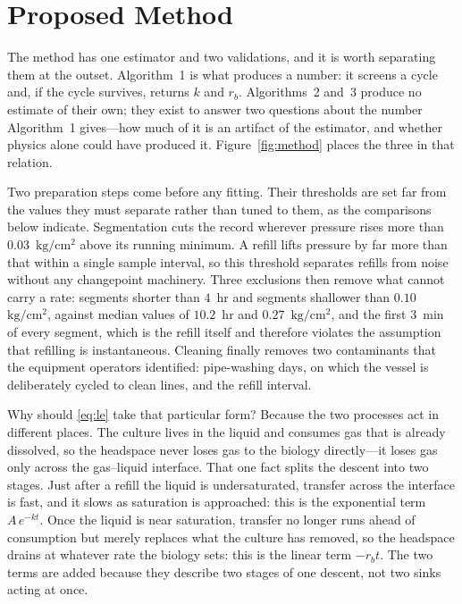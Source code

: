 \documentclass[runningheads]{llncs}
\newcommand{\pu}{\ensuremath{\mathrm{kg/cm^{2}}}}
\newcommand{\rb}{\ensuremath{r_{b}}}
\begin{document}
\section{Proposed Method}
\label{sec:method}

The method has one estimator and two validations, and it is worth
separating them at the outset. Algorithm~1 is what produces a number:
it screens a cycle and, if the cycle survives, returns $k$ and \rb{}.
Algorithms~2 and~3 produce no estimate of their own; they exist to
answer two questions about the number Algorithm~1 gives---how much of
it is an artifact of the estimator, and whether physics alone could
have produced it. Figure~\ref{fig:method} places the three in that
relation.

Two preparation steps come before any fitting. Their thresholds are set
far from the values they must separate rather than tuned to them, as
the comparisons below indicate.
Segmentation cuts the record wherever pressure rises more than
$0.03$~\pu{} above its running minimum. A refill lifts pressure by far
more than that within a single sample interval, so this threshold
separates refills from noise without any changepoint machinery. Three
exclusions then remove what cannot carry a rate: segments shorter than
$4$~hr and segments shallower than $0.10$~\pu{}, against median values
of $10.2$~hr and $0.27$~\pu{}, and the first $3$~min of every segment,
which is the refill itself and therefore violates the assumption that
refilling is instantaneous. Cleaning finally removes two contaminants
that the equipment operators identified: pipe-washing days, on which
the vessel is deliberately cycled to clean lines, and the refill
interval.

Why should \eqref{eq:le} take that particular form? Because the two
processes act in different places. The culture lives in the liquid and
consumes gas that is already dissolved, so the headspace never loses
gas to the biology directly---it loses gas only across the gas--liquid
interface. That one fact splits the descent into two stages. Just after
a refill the liquid is undersaturated, transfer across the interface is
fast, and it slows as saturation is approached: this is the exponential
term $A\,e^{-kt}$. Once the liquid is near saturation, transfer no
longer runs ahead of consumption but merely replaces what the culture
has removed, so the headspace drains at whatever rate the biology sets:
this is the linear term $-\rb t$. The two terms are added because they
describe two stages of one descent, not two sinks acting at once.
\end{document}
